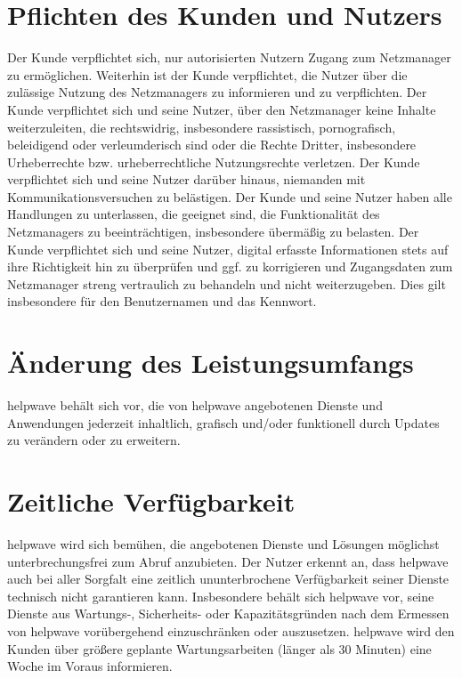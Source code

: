 \documentclass[10pt]{article}
\begin{document}
\section{Pflichten des Kunden und Nutzers}
Der Kunde verpflichtet sich, nur autorisierten Nutzern Zugang zum Netzmanager zu ermöglichen. Weiterhin ist der Kunde verpflichtet, die Nutzer über die zulässige Nutzung des Netzmanagers zu informieren und zu verpflichten. Der Kunde
verpflichtet sich und seine Nutzer, über den Netzmanager keine Inhalte weiterzuleiten, die rechtswidrig, insbesondere rassistisch, pornografisch, beleidigend oder verleumderisch sind oder die Rechte Dritter, insbesondere Urheberrechte bzw. urheberrechtliche Nutzungsrechte verletzen. Der Kunde verpflichtet sich und seine Nutzer darüber hinaus, niemanden mit
Kommunikationsversuchen zu belästigen. Der Kunde und seine Nutzer haben alle Handlungen zu unterlassen, die geeignet
sind, die Funktionalität des Netzmanagers zu beeinträchtigen, insbesondere übermäßig zu belasten. Der Kunde verpflichtet
sich und seine Nutzer, digital erfasste Informationen stets auf ihre Richtigkeit hin zu überprüfen und ggf. zu korrigieren und
Zugangsdaten zum Netzmanager streng vertraulich zu behandeln und nicht weiterzugeben. Dies gilt insbesondere für den
Benutzernamen und das Kennwort.

\section{Änderung des Leistungsumfangs}
helpwave behält sich vor, die von helpwave angebotenen Dienste und Anwendungen jederzeit inhaltlich, grafisch und/oder
funktionell durch Updates zu verändern oder zu erweitern.

\section{Zeitliche Verfügbarkeit}
helpwave wird sich bemühen, die angebotenen Dienste und Lösungen möglichst unterbrechungsfrei zum Abruf anzubieten.
Der Nutzer erkennt an, dass helpwave auch bei aller Sorgfalt eine zeitlich ununterbrochene Verfügbarkeit seiner Dienste
technisch nicht garantieren kann. Insbesondere behält sich helpwave vor, seine Dienste aus Wartungs-, Sicherheits- oder
Kapazitätsgründen nach dem Ermessen von helpwave vorübergehend einzuschränken oder auszusetzen. helpwave wird den
Kunden über größere geplante Wartungsarbeiten (länger als 30 Minuten) eine Woche im Voraus informieren.
\end{document}
